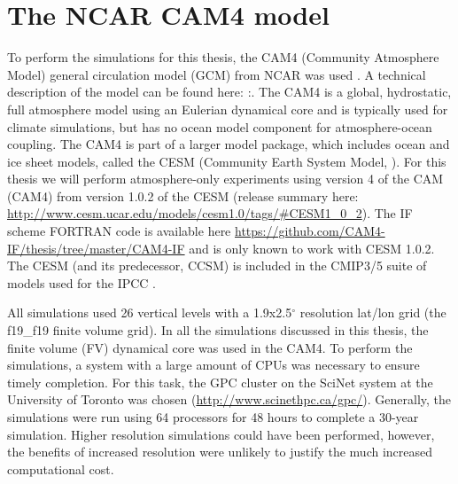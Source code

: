 \documentclass[letterpaper,12pt,titlepage,oneside,final]{book}
\begin{document}
\section{The NCAR CAM4 model}\label{cam4}
To perform the simulations for this thesis, the CAM4 (Community Atmosphere Model) general circulation model (GCM) from NCAR was used \citep{neale_mean_2013}. A technical description of the model can be found here: \citep{neale_description_2010}:. The CAM4 is a global, hydrostatic, full atmosphere model using an Eulerian dynamical core and is typically used for climate simulations, but has no ocean model component for atmosphere-ocean coupling. The CAM4 is part of a larger model package, which includes ocean and ice sheet models, called the CESM (Community Earth System Model, \cite{kay_community_2014}). For this thesis we will perform atmosphere-only experiments using version 4 of the CAM (CAM4) from version 1.0.2 of the CESM (release summary here: \url{http://www.cesm.ucar.edu/models/cesm1.0/tags/#CESM1_0_2}). The IF scheme FORTRAN code is available here \url{https://github.com/CAM4-IF/thesis/tree/master/CAM4-IF} and is only known to work with CESM 1.0.2. The CESM (and its predecessor, CCSM) is included in the CMIP3/5 suite of models used for the IPCC \citep{taylor_overview_2011}. 

All simulations used 26 vertical levels with a 1.9x2.5$^{\circ}$ resolution lat/lon grid (the f19\_f19 finite volume grid). In all the simulations discussed in this thesis, the finite volume (FV) dynamical core was used in the CAM4. To perform the simulations, a system with a large amount of CPUs was necessary to ensure timely completion. For this task, the GPC cluster on the SciNet system at the University of Toronto was chosen (\url{http://www.scinethpc.ca/gpc/}). Generally, the simulations were run using 64 processors for 48 hours to complete a 30-year simulation. Higher resolution simulations could have been performed, however, the benefits of increased resolution were unlikely to justify the much increased computational cost.
\end{document}
